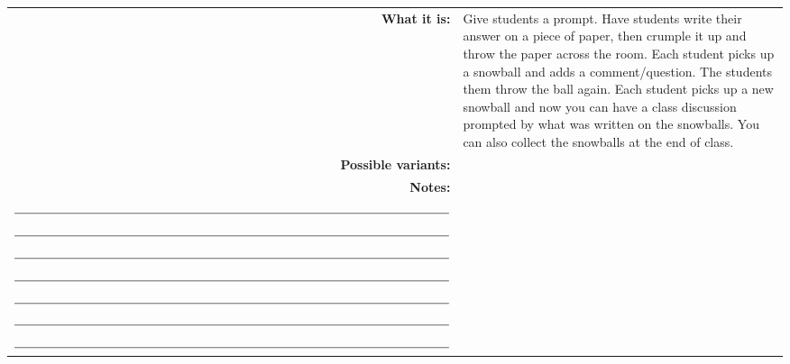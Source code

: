 \begin{center}
  \begin{tabular}{rp{4in}}
    \textbf{What it is:}& Give students a prompt. Have students write their answer on a piece of paper, then crumple it up and throw the paper across the room. Each student picks up a snowball and adds a comment/question. The students them throw the ball again. Each student picks up a new snowball and now you can have a class discussion prompted by what was written on the snowballs. You can also collect the snowballs at the end of class. \\
    \textbf{Possible variants:}&\\
    \textbf{Notes:}& 
    \begin{minipage}{0.8\textwidth}
      \vspace{0.5cm}
      $\rule{\textwidth}{0.15mm}$\\
      $\rule{\textwidth}{0.15mm}$\\
      $\rule{\textwidth}{0.15mm}$\\
      $\rule{\textwidth}{0.15mm}$\\
      $\rule{\textwidth}{0.15mm}$\\
      $\rule{\textwidth}{0.15mm}$\\
      $\rule{\textwidth}{0.15mm}$\\
      $\rule{\textwidth}{0.15mm}$
    \end{minipage}
    \\
  \end{tabular}
\end{center}
